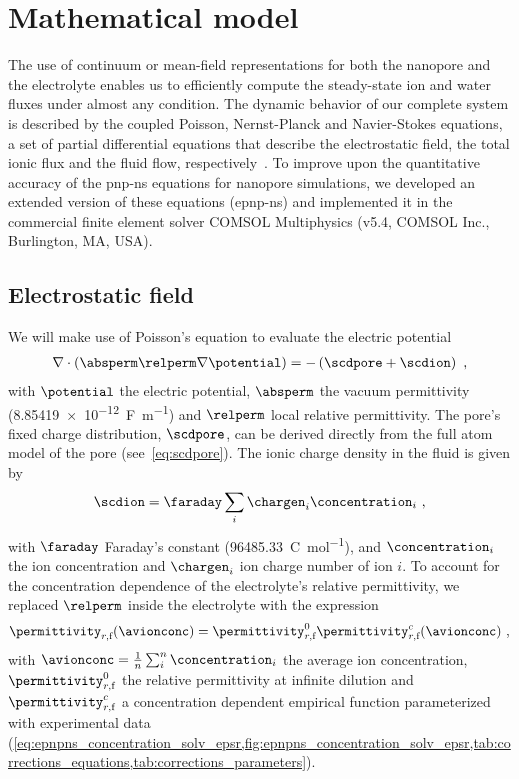 \section{Mathematical model}
%
\label{sec:epnp-ns:model}
%

The use of continuum or mean-field representations for both the nanopore and the electrolyte enables us to
efficiently compute the steady-state ion and water fluxes under almost any condition. The dynamic behavior of
our complete system is described by the coupled Poisson, Nernst-Planck and Navier-Stokes equations, a set of
partial differential equations that describe the electrostatic field, the total ionic flux and the fluid flow,
respectively~\cite{Eisenberg-1996,Cervera-2005,Lu-2012}. To improve upon the quantitative accuracy of the
\gls{pnp-ns} equations for nanopore simulations, we developed an extended version of these equations
({\gls{epnp-ns}}) and implemented it in the commercial finite element solver {COMSOL} Multiphysics (v5.4,
COMSOL Inc., Burlington, MA, USA). 

\subsection{Electrostatic field}
%
\label{sec:epnp-ns:electrostatic_field}
%

We will make use of Poisson's equation to evaluate the electric potential
%
\begin{align}
  \label{eq:poisson}
  \nabla \cdot \left(\absperm \relperm \nabla \potential \right) = -\left( \scdpore + \scdion \right)
  \text{ ,}
\end{align}
%
with $\potential$ the electric potential, $\absperm$ the vacuum permittivity
(\SI{8.85419e-12}{\farad\per\meter}) and $\relperm$ local relative permittivity. The pore's fixed charge
distribution, $\scdpore$,  can be derived directly from the full atom model of the pore
(see~\cref{eq:scdpore}). The ionic charge density in the fluid is given by
%
\begin{align}\label{eq:scdion}
  \scdion = \faraday\sum_{i}\chargen_{i}\concentration_{i}
  \text{ ,}
\end{align}
%
with $\faraday$ Faraday's constant (\SI{96485.33}{\coulomb\per\mole}), and $\concentration_{i}$ the ion
concentration and $\chargen_{i}$ ion charge number of ion $i$. To account for the concentration dependence of
the electrolyte's relative permittivity, we replaced $\relperm$ inside the electrolyte with the expression
%
\begin{align}\label{eq:epnp-ns_relperm_concentration}
  \permittivity_{r,\text{f}}(\avionconc) =
        \permittivity_{r,\text{f}}^0 \permittivity_{r,\text{f}}^c(\avionconc)
  \text{ ,}
\end{align}
%
with $\avionconc=\frac{1}{n}\sum_{i}^{n}\concentration_{i}$ the average ion concentration,
$\permittivity_{r,\text{f}}^0$ the relative permittivity at infinite dilution and
$\permittivity_{r,\text{f}}^c$ a concentration dependent empirical function parameterized with experimental
data
(\cref{eq:epnpns_concentration_solv_epsr,fig:epnpns_concentration_solv_epsr,tab:corrections_equations,tab:corrections_parameters}).


